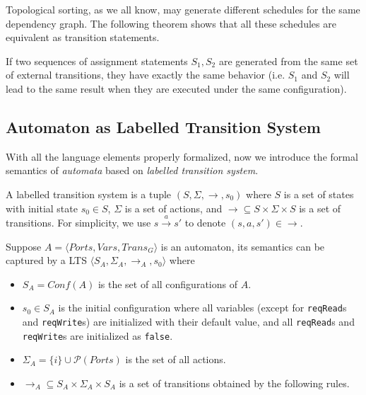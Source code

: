 Topological sorting, as we all know, may generate different schedules for the same dependency graph. The following theorem shows that all these schedules are equivalent as transition statements.

\begin{theorem} If two sequences of assignment statements $S_1, S_2$ are generated from the same set of external transitions, they have exactly the same behavior (i.e. $S_1$ and $S_2$ will lead to the same result when they are executed under the same configuration).
\end{theorem}

\subsection{Automaton as Labelled Transition System}
\label{subsec:lts}

With all the language elements properly formalized, now we introduce the formal semantics of \emph{automata} based on \emph{labelled transition system}.

\begin{definition}
    A labelled transition system is a tuple $(S,\Sigma,\rightarrow,s_0)$ where $S$ is a set of states with initial state $s_0\in S$, $\Sigma$ is a set of actions, and $\rightarrow\subseteq S\times\Sigma\times S$ is a set of transitions. For simplicity, we use $s\xrightarrow{a} s'$ to denote $(s,a,s')\in\rightarrow$.
\end{definition}

Suppose $A=\langle Ports, Vars, Trans_G\rangle$ is an automaton, its semantics can be captured by a LTS $\langle S_A, \Sigma_A,\rightarrow_A,s_0\rangle$ where
\begin{itemize}
    \item $S_A=Conf(A)$ is the set of all configurations of $A$.
    \item $s_0\in S_A$ is the initial configuration where all variables (except for \texttt{reqRead}s and \texttt{reqWrite}s) are initialized with their default value, and all \texttt{reqRead}s and \texttt{reqWrite}s are initialized as \texttt{false}.
    \item $\Sigma_A=\{i\}\cup \mathcal{P}(Ports)$ is the set of all actions.
    \item $\rightarrow_A\subseteq S_A\times \Sigma_A\times S_A$ is a set of transitions obtained by the following rules.
\end{itemize}

